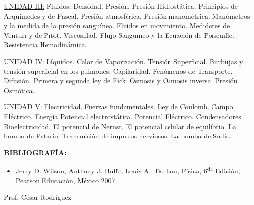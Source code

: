 \documentclass[12pt,letterpaper]{article}
\begin{document}
\vspace{0.3cm}
\noindent \uline{UNIDAD III:} Fluidos. Densidad. Presión. Presión Hidrostática. Principios de Arquímedes y de Pascal. Presión atmosférica. Presión manométrica. Manómetros y la medida de la presión sanguínea. Fluidos en movimiento. Medidores de Venturi y de Pitot. Viscosidad. Flujo Sanguíneo y la Ecuación de Poiseuille. Resistencia Hemodinámica.

\vspace{0.3cm}
\noindent \uline{UNIDAD IV:} Líquidos. Calor de Vaporización. Tensión Superficial. Burbujas y tensión superficial en los pulmones. Capilaridad. Fenómenos de Transporte. Difusión. Primera y segunda ley de Fick. Osmosis y Osmosis inversa. Presión Osmótica.

\vspace{0.3cm}
\noindent \uline{UNIDAD V:} Electricidad. Fuerzas fundamentales. Ley de Coulomb. Campo Eléctrico. Energía Potencial electrostática. Potencial Eléctrico. Condensadores. Bioelectricidad. El potencial de Nernst. El potencial celular de equilibrio. La bomba de Potasio. Transmisión de impulsos nerviosos. La bomba de Sodio.

\vspace{0.5cm}
\noindent \textbf{\uline{BIBLIOGRAFÍA:}}
\begin{itemize}[label=\textbullet, leftmargin=*]
    \item Jerry D. Wilson, Anthony J. Buffa, Louis A., Bo Lou, \uline{Física}, 6\textsuperscript{da} Edición, Pearson Educación, México 2007.
\end{itemize}

\vspace{0.5cm}
\noindent Prof. César Rodríguez
\end{document}
